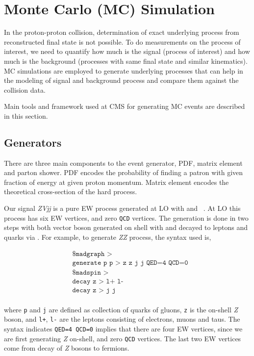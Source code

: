 \section{
  Monte Carlo (MC) Simulation
 }

In the proton-proton collision, determination of
exact underlying process from reconstructed final state is not possible.
To do measurements on the process of interest,
we need to quantify how much is the signal (process of interest)
and how much is the background (processes with same final state and
similar kinematics). \gls{MC} simulations are employed
to generate underlying processes that can help in the
modeling of signal and background process and compare them against the collision
data.

Main tools and framework
used at \gls{CMS} for generating \gls{MC} events
are described in this section.

\subsection{
  Generators
}

There are three main components to the event generator,
\gls{PDF}, matrix element and parton shower.
\gls{PDF} encodes the probability of finding a patron
with given fraction of energy at given proton momentum.
Matrix element encodes
the theoretical cross-section of the hard process.

Our signal \textit{ZVjj} is a pure \gls{EW} process generated
at \gls{LO} with \MGvATNLO{} and \MADSPIN{}~\cite{madgraph,madspin}.
At \gls{LO} this process has six \gls{EW} vertices, and
zero \texttt{QCD} vertices. The generation is done
in two steps with both vector boson generated on shell
with \MADGRAPH{} and decayed to leptons and quarks via \MADSPIN{}.
For example, to generate \textit{ZZ} process, the syntax used is,

\begin{align*}
   & \texttt{\$ madgraph >}                      \\
   & \texttt{generate p p > z z j j QED=4 QCD=0} \\
   & \texttt{\$ madspin >}                       \\
   & \texttt{decay z > l+ l-}                    \\
   & \texttt{decay z > j j}                      \\
\end{align*}

where \texttt{p} and \texttt{j} are defined as collection of quarks of gluons,
\texttt{z} is the on-shell \textit{Z} boson, and \texttt{l+}, \texttt{l-}
are the leptons consisting of electrons, muons and taus. The syntax
indicates \texttt{QED=4 QCD=0} implies that there are four \gls{EW}
vertices, since we are first generating \textit{Z} on-shell, and zero
\texttt{QCD} vertices. The last two \gls{EW} vertices come from
decay of \textit{Z} bosons to fermions.

